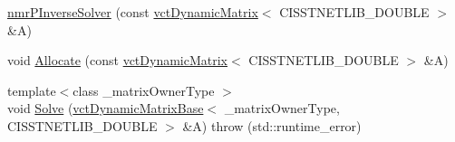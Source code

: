 {\bf }\par
\begin{DoxyCompactItemize}
\item 
\hyperlink{classnmr_p_inverse_solver_acabdec40373b7508a5972e5fa6a51dc4}{nmr\-P\-Inverse\-Solver} (const \hyperlink{classvct_dynamic_matrix}{vct\-Dynamic\-Matrix}$<$ C\-I\-S\-S\-T\-N\-E\-T\-L\-I\-B\-\_\-\-D\-O\-U\-B\-L\-E $>$ \&A)
\end{DoxyCompactItemize}

{\bf }\par
\begin{DoxyCompactItemize}
\item 
void \hyperlink{classnmr_p_inverse_solver_ab7941745d59905a3edc00934a39bb3d4}{Allocate} (const \hyperlink{classvct_dynamic_matrix}{vct\-Dynamic\-Matrix}$<$ C\-I\-S\-S\-T\-N\-E\-T\-L\-I\-B\-\_\-\-D\-O\-U\-B\-L\-E $>$ \&A)
\end{DoxyCompactItemize}

{\bf }\par
\begin{DoxyCompactItemize}
\item 
{\footnotesize template$<$class \-\_\-matrix\-Owner\-Type $>$ }\\void \hyperlink{classnmr_p_inverse_solver_aac1f684ee9607cd5538f354a2f77dfa3}{Solve} (\hyperlink{classvct_dynamic_matrix_base}{vct\-Dynamic\-Matrix\-Base}$<$ \-\_\-matrix\-Owner\-Type, C\-I\-S\-S\-T\-N\-E\-T\-L\-I\-B\-\_\-\-D\-O\-U\-B\-L\-E $>$ \&A)  throw (std\-::runtime\-\_\-error)
\end{DoxyCompactItemize}

